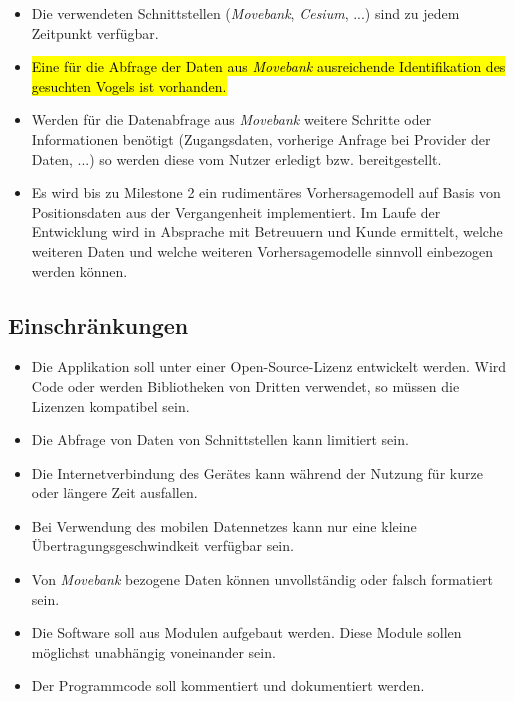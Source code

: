\documentclass[12pt]{article} %
\begin{document}
\begin{itemize} 
 	 \item Die verwendeten Schnittstellen (\textit{Movebank}, \textit{Cesium}, ...) sind zu jedem Zeitpunkt verfügbar.
 	 \item \hl{Eine für die Abfrage der Daten aus \textit{Movebank} ausreichende Identifikation des gesuchten Vogels ist vorhanden.}
 	 \item Werden für die Datenabfrage aus \textit{Movebank} weitere Schritte oder Informationen benötigt (Zugangsdaten, vorherige Anfrage bei Provider der Daten, ...) so werden diese vom Nutzer erledigt bzw. bereitgestellt.
 	 \item Es wird bis zu Milestone 2 ein rudimentäres Vorhersagemodell auf Basis von Positionsdaten aus der Vergangenheit implementiert. Im Laufe der Entwicklung wird in Absprache mit Betreuuern und Kunde ermittelt, welche weiteren Daten und welche weiteren Vorhersagemodelle sinnvoll einbezogen werden können.
\end{itemize} 


\subsection{Einschränkungen}

\begin{itemize} 
	\item Die Applikation soll unter einer Open-Source-Lizenz entwickelt werden. Wird Code oder werden Bibliotheken von Dritten verwendet, so müssen die Lizenzen kompatibel sein.
	\item Die Abfrage von Daten von Schnittstellen kann limitiert sein.
	\item Die Internetverbindung des Gerätes kann während der Nutzung für kurze oder längere Zeit ausfallen.
	\item Bei Verwendung des mobilen Datennetzes kann nur eine kleine Übertragungsgeschwindkeit verfügbar sein.
	\item Von \textit{Movebank} bezogene Daten können unvollständig oder falsch formatiert sein.
	\item Die Software soll aus Modulen aufgebaut werden. Diese Module sollen möglichst unabhängig voneinander sein.
	\item Der Programmcode soll kommentiert und dokumentiert werden.
\end{itemize} 
\end{document}
